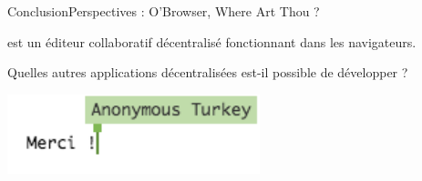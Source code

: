 \begin{frame}{Conclusion}{Perspectives : O'Browser, Where Art Thou ?}

  \CRATE est un éditeur collaboratif décentralisé fonctionnant dans les
  navigateurs.

  \vspace{0.25cm}

  Quelles autres applications décentralisées est-il possible de développer ?

  \vspace{0.25cm}
  
  \begin{center}
    
  \end{center}

\end{frame}


\begin{frame}
  
  \begin{center}
    \includegraphics[width=0.55\textwidth]{img/thanks.png}
  \end{center}

\end{frame}